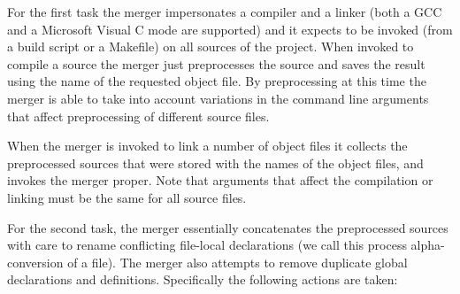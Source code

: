\documentclass[letterpaper]{article}
\begin{document}
 For the first task the merger impersonates a compiler and a linker (both a
GCC and a Microsoft Visual C mode are supported) and it expects to be invoked
(from a build script or a Makefile) on all sources of the project. When
invoked to compile a source the merger just preprocesses the source and saves
the result using the name of the requested object file. By preprocessing at
this time the merger is able to take into account variations in the command
line arguments that affect preprocessing of different source files.

 When the merger is invoked to link a number of object files it collects the
preprocessed sources that were stored with the names of the object files, and
invokes the merger proper. Note that arguments that affect the compilation or
linking must be the same for all source files.

 For the second task, the merger essentially concatenates the preprocessed
sources with care to rename conflicting file-local declarations (we call this
process alpha-conversion of a file). The merger also attempts to remove
duplicate global declarations and definitions. Specifically the following
actions are taken:
\end{document}
